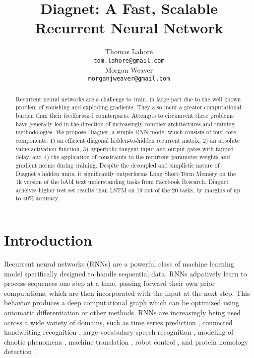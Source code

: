 \documentclass{article}
\title{Diagnet: A Fast, Scalable Recurrent Neural Network}
\author{
Thomas Lahore\\
\texttt{tom.lahore@gmail.com}\\
\And
Morgan Weaver\\
\texttt{morganjweaver@gmail.com}
}
\begin{document}
\maketitle
\begin{abstract}

Recurrent neural networks are a challenge to train, in large part due to the well known problem of vanishing and exploding gradients. They also incur a greater computational burden than their feedforward counterparts. Attempts to circumvent these problems have generally led in the direction of increasingly complex architectures and training methodologies. We propose Diagnet, a simple RNN model which consists of four core components: 1) an efficient diagonal hidden-to-hidden recurrent matrix, 2) an absolute value activation function, 3) hyperbolic tangent input and output gates with tapped delay, and 4) the application of constraints to the recurrent parameter weights and gradient norms during training. Despite the decoupled and simplistic nature of Diagnet's hidden units, it significantly outperforms Long Short-Term Memory on the 1k version of the bAbI text understanding tasks from Facebook Research. Diagnet acheives higher test set results than LSTM on 19 out of the 20 tasks, by margins of up to 40\% accuracy.

  

\end{abstract}

\section{Introduction}

Recurrent neural networks (RNNs) are a powerful class of machine learning model specifically designed to handle sequential data. RNNs adpatively learn to process sequences one step at a time, passing forward their own prior computations, which are then incorporated with the input at the next step. This behavior produces a deep computational graph which can be optimized using automatic differentiation or other methods. RNNs are increasingly being used across a wide variety of domains, such as time series prediction \citep{Giles2001}, connected handwriting recognition \citep{graves2009offline}, large-vocabulary speech recognition \citep{SakSB14}, modeling of chaotic phenomena \citep{PhysRevLett.120.024102}, machine translation \citep{bahdanau2014neural, mikolov2010recurrent}, robot control \citep{oubbati2005kinematic}, and protein homology detection \citep{el2008predicting}.
\end{document}
